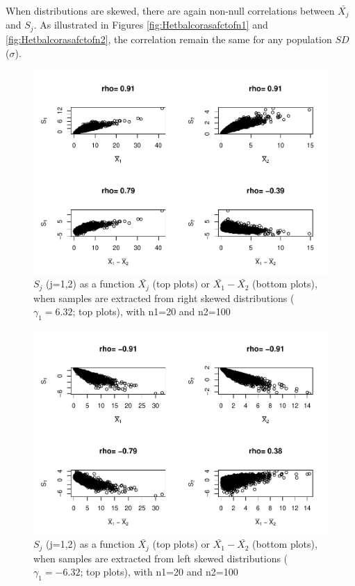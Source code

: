 \documentclass[
  man]{apa6}
\begin{document}
When distributions are skewed, there are again non-null correlations between \(\bar{X_j}\) and \(S_j\). As illustrated in Figures \ref{fig:Hetbalcorasafctofn1} and \ref{fig:Hetbalcorasafctofn2}, the correlation remain the same for any population \(SD\) (\(\sigma\)).

\begin{figure}
\centering
\includegraphics{Correlations-between-the-sample-means-difference-and-standardizers-of-all-estimators,-and-implications-on-biases-and-variances-of-all-estimators_files/figure-latex/pltSDHetbalRskew-1.pdf}
\caption{\label{fig:pltSDHetbalRskew}\(S_j\) (j=1,2) as a function \(\bar{X_j}\) (top plots) or \(\bar{X_1}-\bar{X_2}\) (bottom plots), when samples are extracted from right skewed distributions (\(\gamma_1 = 6.32\); top plots), with n1=20 and n2=100}
\end{figure}

\begin{figure}
\centering
\includegraphics{Correlations-between-the-sample-means-difference-and-standardizers-of-all-estimators,-and-implications-on-biases-and-variances-of-all-estimators_files/figure-latex/pltSDHetbalLskew-1.pdf}
\caption{\label{fig:pltSDHetbalLskew}\(S_j\) (j=1,2) as a function \(\bar{X_j}\) (top plots) or \(\bar{X_1}-\bar{X_2}\) (bottom plots), when samples are extracted from left skewed distributions (\(\gamma_1 = -6.32\); top plots), with n1=20 and n2=100}
\end{figure}
\end{document}
